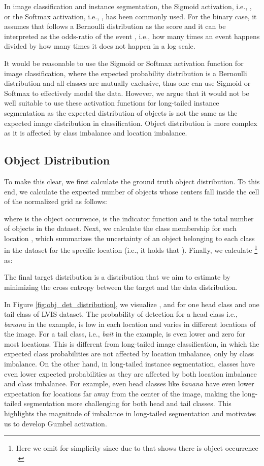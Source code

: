 \documentclass[runningheads]{llncs}
\begin{document}
In image classification and instance segmentation, the Sigmoid activation, i.e.,  , or the Softmax activation, i.e.,  , has been commonly used. For the binary case, it assumes that  follows a Bernoulli distribution as the score   and it can be interpreted as the odds-ratio of the event , i.e., how many times an event happens  divided by how many times it does not happen  in a log scale.
 


It would be reasonable to use the Sigmoid or Softmax activation function for image classification, where the expected probability distribution  is a Bernoulli distribution and all classes are mutually exclusive, thus one can use Sigmoid or Softmax to effectively model the data.
However, we argue that it would not be well suitable to use these activation functions for long-tailed instance segmentation as the expected distribution of objects is not the same as the expected image distribution in classification. Object distribution is more complex as it is affected by class imbalance and location imbalance.  

\subsection{Object Distribution}
\label{obj_distr_calculation}
To make this clear, we first calculate the ground truth object distribution. To this end, we calculate the expected number of objects  whose centers fall inside the cell  of the normalized grid as follows:

where  is the object occurrence,  is the indicator function and  is the total number of objects in the dataset.
Next, we calculate the class membership  for each location , which summarizes the uncertainty of an object belonging to each class  in the dataset for the specific location  (i.e., it holds that ). Finally, we calculate \footnote{Here we omit  for simplicity since  due to that  shows there is object occurrence .} as:


The final target distribution is a distribution that we aim to estimate by minimizing the cross entropy between the target and the data distribution.

In Figure \ref{fig:obj_det_distribution}, we visualize ,  and  for one head class and one tail class of LVIS dataset. 
The probability of detection for a head class i.e.,  \textit{banana} in the example, is low in each location and varies in different locations of the image. For a tail class, i.e.,  \textit{bait} in the example, is even lower and zero for most locations. This is different from long-tailed  image classification, in which the expected class probabilities are not affected by location imbalance, only by class imbalance. On the other hand, in long-tailed  instance segmentation, classes have even lower expected probabilities as they are affected by both location imbalance and class imbalance. For example, even head classes like \textit{banana} have even lower expectation for locations far away from the center of the image, making the long-tailed  segmentation more challenging for both head and tail classes. This highlights the magnitude of imbalance in long-tailed  segmentation and motivates us to develop Gumbel activation.
\end{document}
